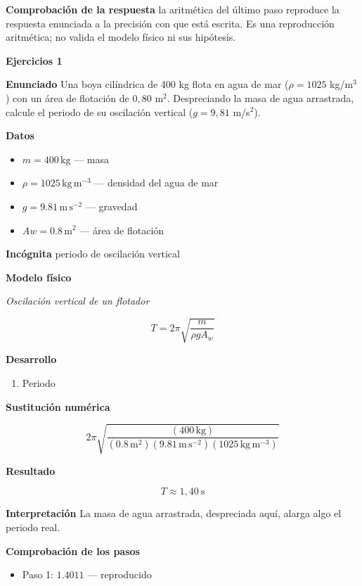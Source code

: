 \documentclass[10pt,openany]{book}
\begin{document}
\noindent\textbf{Comprobación de la respuesta} la aritmética del último paso reproduce la respuesta enunciada a la precisión con que está escrita. Es una reproducción aritmética; no valida el modelo físico ni sus hipótesis.

\noindent\textbf{Ejercicios 1}

\noindent\textbf{Enunciado}
Una boya cilíndrica de 400 kg flota en agua de mar (\(\rho = 1025\) kg/m\(^3\)) con un área de flotación de \(0{,}80\) m\(^2\). Despreciando la masa de agua arrastrada, calcule el periodo de su oscilación vertical (\(g = 9{,}81\) m/s\(^2\)).

\noindent\textbf{Datos}
\begin{itemize}
\item $m = 400\,\mathrm{kg}$ — masa
\item $\rho = 1025\,\mathrm{kg}\,\mathrm{m}^{-3}$ — densidad del agua de mar
\item $g = 9.81\,\mathrm{m}\,\mathrm{s}^{-2}$ — gravedad
\item $Aw = 0.8\,\mathrm{m}^{2}$ — área de flotación
\end{itemize}

\noindent\textbf{Incógnita}
periodo de oscilación vertical

\noindent\textbf{Modelo físico}

\noindent\textit{Oscilación vertical de un flotador}

\[
T = 2\pi\sqrt{\frac{m}{\rho g A_w}}
\]

\noindent\textbf{Desarrollo}
\begin{enumerate}
\item
Periodo
\end{enumerate}

\noindent\textbf{Sustitución numérica}

\[
2 \pi \sqrt{\frac{\left(400\,\mathrm{kg}\right)}{\left(0.8\,\mathrm{m}^{2}\right) \left(9.81\,\mathrm{m}\,\mathrm{s}^{-2}\right) \left(1025\,\mathrm{kg}\,\mathrm{m}^{-3}\right)}}
\]

\noindent\textbf{Resultado}

\[
T \approx 1{,}40\ \mathrm{s}
\]

\noindent\textbf{Interpretación}
La masa de agua arrastrada, despreciada aquí, alarga algo el periodo real.

\noindent\textbf{Comprobación de los pasos}
\begin{itemize}
\item Paso 1: $1.4011$ — reproducido
\end{itemize}
\end{document}

